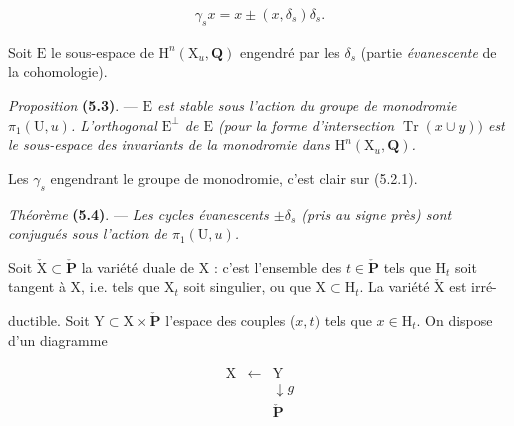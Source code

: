 \documentclass[10pt,leqno]{article}
\begin{document}
\begin{equation*}\begin{gathered}\gamma _{s} x = x \pm  (x,\delta _{s})\delta _{s}.\end{gathered}\tag{5.2.1}\end{equation*}

\noindent Soit \(\mathrm{E}\) le sous-espace de \(\mathrm{H}^{n}(\mathrm{X}_{u},\mathbf{Q})\) engendré par les \(\delta _{s}\) (partie \emph{évanescente} de la cohomologie).\par

\noindent \emph{Proposition} \textbf{(5.3)}. — {\itshape \(\mathrm{E}\) est stable sous l’action du groupe de monodromie \(\pi _{1}(\mathrm{U},u)\). L’orthogonal \(\mathrm{E}^{\perp }\) de \(\mathrm{E}\) (pour la forme d’intersection \(\operatorname{Tr}(x\cup y))\) est le sous-espace des invariants de la monodromie dans \(\mathrm{H}^{n}(\mathrm{X}_{u},\mathbf{Q})\).}\par

\noindent Les \(\gamma _{s}\) engendrant le groupe de monodromie, c’est clair sur (5.2.1).\par

\noindent \emph{Théorème} \textbf{(5.4)}. — {\itshape Les cycles évanescents \(\pm \delta _{s}\) (pris au signe près) sont conjugués sous l’action de \(\pi _{1}(\mathrm{U},u)\).}\par

\noindent Soit \(\check{\mathrm{X}}\subset \check{\mathbf{P}}\) la variété duale de \(\mathrm{X}\) : c’est l’ensemble des \(t\in \check{\mathbf{P}}\) tels que \(\mathrm{H}_{t}\) soit tangent à \(\mathrm{X}\), i.e. tels que \(\mathrm{X}_{t}\) soit singulier, ou que \(\mathrm{X}\subset \mathrm{H}_{t}\). La variété \(\check{\mathrm{X}}\) est irré-\par

\clearpage

\label{physical-20}

\noindent ductible. Soit \(\mathrm{Y}\subset \mathrm{X}\times \check{\mathbf{P}}\) l’espace des couples (\(x,t)\) tels que \(x\in \mathrm{H}_{t}\). On dispose d’un diagramme\par

\[\begin{array}{ccc}\mathrm X&\xleftarrow{}&\mathrm Y\\ &&\downarrow\!{g}\\ &&\check{\mathbf P}\end{array}\]
\end{document}
